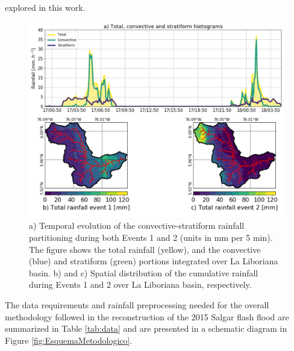 \documentclass[hess, manuscript]{copernicus}
\begin{document}
explored in this work. \\


\begin{figure}[t]
\centering
 \includegraphics[width=12cm]{Figures/Rainfall_separation.png}
 \caption{a) Temporal evolution of the convective-stratiform rainfall partitioning during both Events 1 and 2 (units in mm per 5 min). The figure shows the total rainfall (yellow), and the convective (blue) and stratiform (green) portions integrated over La Liboriana basin. b) and c) Spatial distribution of the cumulative rainfall during Events 1 and 2 over La Liboriana basin, respectively.}
    \label{fig:separacionLluvia}
\end{figure}

The data requirements and rainfall preprocessing needed for the overall methodology followed in the reconstruction of the 2015 Salgar flash flood are summarized in Table \ref{tab:data} and are  presented in a schematic diagram in Figure \ref{fig:EsquemaMetodologico}. \\
\end{document}
